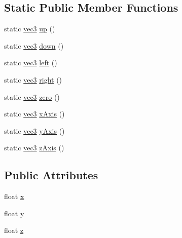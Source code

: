 \subsection*{Static Public Member Functions}
\begin{DoxyCompactItemize}
\item 
static \hyperlink{structspork_1_1maths_1_1vec3}{vec3} \hyperlink{structspork_1_1maths_1_1vec3_abc666e8d44e5e295c74e93c75c358c16}{up} ()
\item 
static \hyperlink{structspork_1_1maths_1_1vec3}{vec3} \hyperlink{structspork_1_1maths_1_1vec3_a7be169be3105cfc288112f35655e9dea}{down} ()
\item 
static \hyperlink{structspork_1_1maths_1_1vec3}{vec3} \hyperlink{structspork_1_1maths_1_1vec3_a7aa9b70355b9a0d4a30372c0d2e4b05a}{left} ()
\item 
static \hyperlink{structspork_1_1maths_1_1vec3}{vec3} \hyperlink{structspork_1_1maths_1_1vec3_ab70b578c5f09ed3323ce8159a3e243a4}{right} ()
\item 
static \hyperlink{structspork_1_1maths_1_1vec3}{vec3} \hyperlink{structspork_1_1maths_1_1vec3_a8dbbfad5ee61d3f78a172bf9f2bcbcef}{zero} ()
\item 
static \hyperlink{structspork_1_1maths_1_1vec3}{vec3} \hyperlink{structspork_1_1maths_1_1vec3_a236424fe30d86a98406e46e4f26289a0}{x\+Axis} ()
\item 
static \hyperlink{structspork_1_1maths_1_1vec3}{vec3} \hyperlink{structspork_1_1maths_1_1vec3_a0a655d16fc128c7c288cf77d50fb51cc}{y\+Axis} ()
\item 
static \hyperlink{structspork_1_1maths_1_1vec3}{vec3} \hyperlink{structspork_1_1maths_1_1vec3_a60f7fb8ce3a15cb3d4a7b77848244e3b}{z\+Axis} ()
\end{DoxyCompactItemize}
\subsection*{Public Attributes}
\begin{DoxyCompactItemize}
\item 
float \hyperlink{structspork_1_1maths_1_1vec3_a0ad9ff5d633e78698328da4697e6429c}{x}
\item 
float \hyperlink{structspork_1_1maths_1_1vec3_a52923b4784782eef93946328931a30cc}{y}
\item 
float \hyperlink{structspork_1_1maths_1_1vec3_ac6c368d1e1e30be899a7e02cfa55354d}{z}
\end{DoxyCompactItemize}
